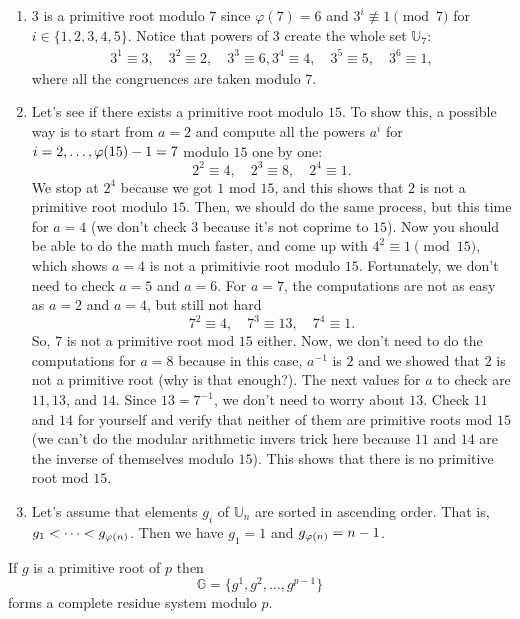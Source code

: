 \documentclass{subfile}
\begin{document}
		\begin{example}
		$ $
		\begin{enumerate}
			\item $3$ is a primitive root modulo $7$ since $\varphi(7)=6$ and $3^i\not\equiv1\pmod 7$ for $i\in\{1,2,3,4,5\}$. Notice that powers of $3$ create the whole set $\mathbb U_7$:
			\begin{align*}
				3^1 \equiv 3, \quad 3^2 \equiv 2, \quad 3^3 \equiv 6, 3^4 \equiv 4, \quad 3^5 \equiv 5, \quad 3^6 \equiv 1,
			\end{align*}
			where all the congruences are taken modulo $7$.
			\item Let's see if there exists a primitive root modulo $15$. To show this, a possible way is to start from $a=2$ and compute all the powers $a^i$ for $i=2,\ldots,\varphi(15)-1=7$ modulo $15$ one by one:
			$$ 2^2 \equiv 4, \quad 2^3 \equiv 8, \quad 2^4 \equiv 1.$$
			We stop at $2^4$ because we got $1$ mod $15$, and this shows that $2$ is not a primitive root modulo $15$. Then, we should do the same process, but this time for $a=4$ (we don't check $3$ because it's not coprime to $15$). Now you should be able to do the math much faster, and come up with $4^2 \equiv 1 \pmod{15}$, which shows $a=4$ is not a primitivie root modulo $15$. Fortunately, we don't need to check $a=5$ and $a=6$. For $a=7$, the computations are not as easy as $a=2$ and $a=4$, but still not hard
			$$7^2 \equiv 4, \quad 7^3 \equiv 13, \quad 7^4 \equiv 1.$$
			So, $7$ is not a primitive root mod $15$ either. Now, we don't need to do the computations for $a=8$ because in this case, $a^{-1}$ is $2$ and we showed that $2$ is not a primitive root (why is that enough?). The next values for $a$ to check are $11, 13$, and $14$. Since $13=7^{-1}$, we don't need to worry about $13$. Check $11$ and $14$ for yourself and verify that neither of them are primitive roots mod $15$ (we can't do the modular arithmetic invers trick here because $11$ and $14$ are the inverse of themselves modulo $15$). This shows that there is no primitive root mod $15$.
			
			\item Let's assume that elements $g_i$ of $\mathbb U_n$ are sorted in ascending order. That is, $g_1<\cdots<g_{\varphi(n)}$. Then we  have $g_1=1$ and $g_{\varphi(n)}=n-1$.
		\end{enumerate}
	\end{example}
	
	
	\begin{corollary}\label{cor:prres}
		If $g$ is a primitive root of $p$ then 
		\[\mathbb G=\{g^1,g^2,\ldots,g^{p-1}\}\]
		forms a complete residue system modulo $p$.
	\end{corollary}
	
\end{document}
